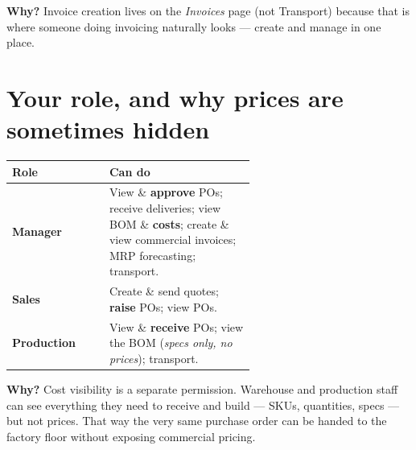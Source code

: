 \documentclass[11pt]{article}
\newcommand{\role}[1]{\textbf{\color{ebgreen}#1}}
\newcommand{\whybox}[1]{\par\vspace{3pt}\noindent\colorbox{ebtint}{\parbox{\dimexpr\linewidth-2\fboxsep}%
  {\vspace{3pt}\hspace{2pt}\textbf{\color{ebgreen}Why?} #1\hspace{2pt}\vspace{3pt}}}\par\vspace{3pt}}
\begin{document}
\whybox{Invoice creation lives on the \emph{Invoices} page (not Transport) because
that is where someone doing invoicing naturally looks --- create and manage in one
place.}

\section{Your role, and why prices are sometimes hidden}
\begin{center}
\begin{tabular}{@{}lp{0.60\linewidth}@{}}
\toprule
\textbf{\color{ebgreen}Role} & \textbf{\color{ebgreen}Can do} \\
\midrule
\role{Manager}    & View \& \textbf{approve} POs; receive deliveries; view BOM \& \textbf{costs}; create \& view commercial invoices; MRP forecasting; transport. \\
\role{Sales}      & Create \& send quotes; \textbf{raise} POs; view POs. \\
\role{Production} & View \& \textbf{receive} POs; view the BOM (\emph{specs only, no prices}); transport. \\
\bottomrule
\end{tabular}
\end{center}

\whybox{Cost visibility is a separate permission. Warehouse and production staff can
see everything they need to receive and build --- SKUs, quantities, specs --- but not
prices. That way the very same purchase order can be handed to the factory floor
without exposing commercial pricing.}

\vspace{0.4cm}
\noindent{\color{ebgreen}\rule{\linewidth}{1pt}}\\[0.2cm]
\end{document}
